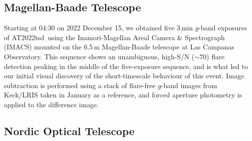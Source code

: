 \documentclass{nature_plusfigure}
\newcommand{\at}{AT2022tsd}
\begin{document}
\begin{methods}

\subsection{Magellan-Baade Telescope}
\label{sec:magellan}

Starting at 04:30 on 2022 December 15, we obtained five 3\,min $g$-band exposures of \at\ using the Inamori-Magellan Areal Camera \& Spectrograph (IMACS\cite{Dressler2011}) mounted on the 6.5\,m Magellan-Baade telescope at Las Campanas Observatory.  This sequence shows an unambiguous, high-S/N ($\sim 70$) flare detection peaking in the middle of the five-exposure sequence, and is what led to our initial visual discovery of the short-timescale behaviour of this event.  Image subtraction is performed using a stack of flare-free $g$-band images from Keck/LRIS taken in January as a reference, and forced aperture photometry is applied to the difference image.

\subsection{Nordic Optical Telescope}
\label{sec:not}


\end{methods}
\end{document}
